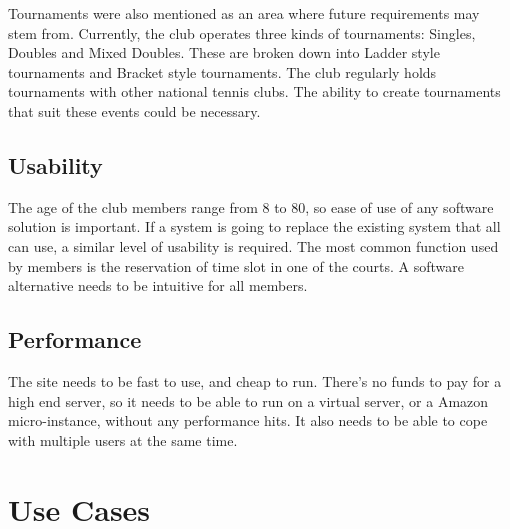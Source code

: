 Tournaments were also mentioned as an area where future requirements may stem from. Currently, the club operates three kinds of tournaments: Singles, Doubles and Mixed Doubles. These are broken down into Ladder style tournaments and Bracket style tournaments. The club regularly holds tournaments with other national tennis clubs. The ability to create tournaments that suit these events could be necessary.

\subsection{Usability}

The age of the club members range from 8 to 80, so ease of use of any software solution is important. If a system is going to replace the existing system that all can use, a similar level of usability is required. The most common function used by members is the reservation of time slot in one of the courts. A software alternative needs to be intuitive for all members.

\subsection{Performance}

The site needs to be fast to use, and cheap to run. There's no funds to pay for a high end server, so it needs to be able to run on a virtual server, or a Amazon micro-instance, without any performance hits. It also needs to be able to cope with multiple users at the same time. 

\section{Use Cases}


